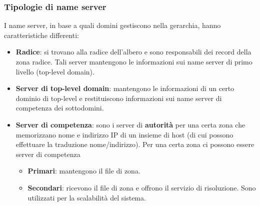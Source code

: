 \subsubsection{Tipologie di name server}
I name server, in base a quali domini gestiscono nella gerarchia, hanno caratteristiche differenti:
\begin{itemize}
	\item \textbf{Radice}: si trovano alla radice dell'albero e sono responsabili dei record della
	      zona radice. Tali server mantengono le informazioni sui name server di primo livello
	      (top-level domain).
	\item \textbf{Server di top-level domain}: mantengono le informazioni di un certo dominio di
	      top-level e restituiscono informazioni sui name server di competenza dei sottodomini.
	\item \textbf{Server di competenza}: sono i server di \textbf{autorità} per una certa zona che
	      memorizzano nome e indirizzo IP di un insieme di host (di cui possono effettuare la
	      traduzione nome/indirizzo). Per una certa zona ci possono essere server di competenza
	      \begin{itemize}
		      \item \textbf{Primari}: mantengono il file di zona.
		      \item \textbf{Secondari}: ricevono il file di zona e offrono il servizio di
		            risoluzione. Sono utilizzati per la scalabilità del sistema.
	      \end{itemize}
\end{itemize}
